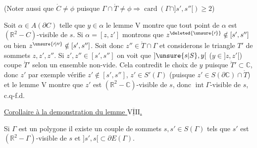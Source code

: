 (Noter aussi que $\mathring{C}\ne\phi$ puisque $\Gamma\cap\mathring{T}\ne\phi\Rightarrow\operatorname{card}(\Gamma\cap]s',s''[)\geq 2$)

Soit $\alpha\in A(\partial C)$ telle que $y\in\alpha$ le lemme V montre que tout point de $\alpha$ est $(\mathbb{R}^2-C)$-visible de $s$. Si $\alpha=[z,z']$ montrons que $z^{\deleted{\unsure{\prime}}}\notin[s',s'']$ ou bien $z^{\unsure{\prime|\prime\prime}}\notin[s',s'']$. Soit donc $z''\in\mathring{T}\cap\Gamma$ et considerons le triangle $T'$ de sommets $z,z',z''$. Si $z',z''\in[s',s'']$ on voit que $]\unsure{s|S},y[$ ($y\in]z,z'[$) coupe $\mathring{T}'$ selon un ensemble non-vide. Cela contredit le choix de $y$ puisque $\mathring{T}'\subset\mathbb{C}$,  donc $z'$ par exemple vérifie $z'\notin[s',s'']$, $z'\in S'(\Gamma)$ (puisque $z'\in S(\partial\mathbb{C})\cap\mathring{T}$) et le lemme  V montre que $z'$ est $(\mathbb{R}^2-\mathbb{C})$-visible de $s$, donc $\operatorname{int}\Gamma$-visible de $s$, c.q-f.d.

\uline{Corollaire à la demonstration du lemme $\underline{\overline{\mathrm{VIII}}}$.} \margin{!!}

Si $\Gamma$ est un polygone il existe un couple de sommets  $s,s'\in S(\Gamma)$ tels que $s'$ est  $(\mathbb{R}^2-\Gamma)$-visible de $s$ et $]s',s[\subset\partial E(\Gamma)$.
